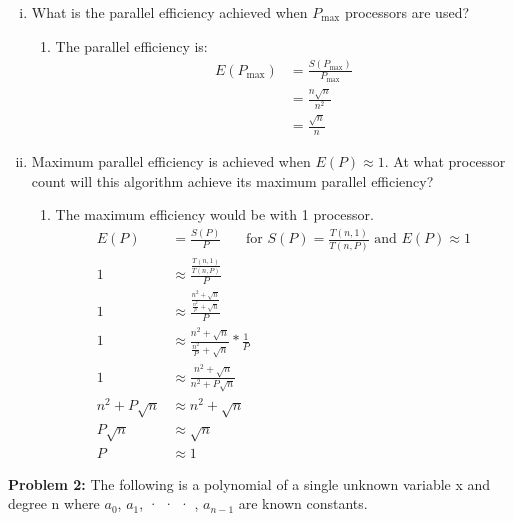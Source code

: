 \documentclass{article}
\begin{document}
\begin{enumerate}[i.]
\begin{enumerate}
            \end{enumerate}
        \item What is the parallel efficiency achieved when $P_{\max}$ processors are used?
            \begin{enumerate}
                \item The parallel efficiency is:
                \begin{align*}
                    E({P_{\max}}) & = \frac{S(P_{\max})}{P_{\max}} \\
                    & = \frac{n\sqrt{n}}{n^2} \\
                    & = \frac{\sqrt{n}}{n}
                \end{align*}
            \end{enumerate}
        \item Maximum parallel efficiency is achieved when $E(P)\approx1$. At what processor count will this
        algorithm achieve its maximum parallel efficiency?
            \begin{enumerate}
                \item The maximum efficiency would be with 1 processor.
                    \begin{align*}
                        E(P) & = \frac{S(P)}{P} \phantom{text}\text{for } S(P)=\frac{T(n,1)}{T(n,P)} \text{ and } E(P) \approx 1 \\
                        1 & \approx \frac{\frac{T(n,1)}{T(n,P)}}{P} \\
                        1 & \approx \frac{\frac{n^2+\sqrt{n}}{\frac{n^2}{p}+\sqrt{n}}}{P} \\
                        1 & \approx \frac{n^2+\sqrt{n}}{\frac{n^2}{P}+\sqrt{n}} * \frac{1}{P} \\
                        1 & \approx \frac{n^2+\sqrt{n}}{n^2+P\sqrt{n}} \\
                        n^2+P\sqrt{n} & \approx n^2+\sqrt{n} \\
                        P\sqrt{n} & \approx \sqrt{n} \\
                        P & \approx 1
                    \end{align*}
            \end{enumerate}
    \end{enumerate}

    \textbf{Problem 2:} The following is a polynomial of a single unknown variable x and degree n where $a_{0}$, $a_{1}$, · · · , $a_{n-1}$
    are known constants.
\end{document}
